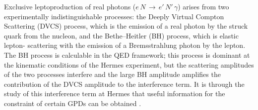 Exclusive leptoproduction of real photons
($e\,N\,\rightarrow\,e'\,N'\,\gamma$) arises from
two experimentally indistinguishable processes: the Deeply Virtual Compton Scattering (DVCS) process,
which is the emission of a real photon by the struck quark from the nucleon, and the Bethe--Heitler (BH) process, which is elastic lepton- scattering with the
emission of a Bremsstrahlung photon by the lepton. 
The BH process is calculable in the QED framework; this process is
dominant at the kinematic conditions of the H{\sc ermes} experiment, but the
scattering amplitudes of the two processes interfere and the large BH amplitude
amplifies the contribution of the DVCS amplitude to the interference term. 
It is through the study of this interference term at H{\sc ermes} that
useful information for the constraint of certain GPDs can be obtained \cite{Bel02b}.

